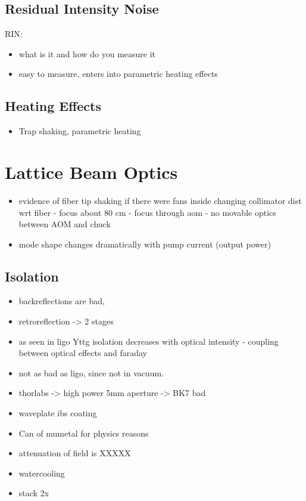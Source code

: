 \documentclass[twocolumn,aps,pra,showpacs,preprintnumbers,bibnotes]{revtex4-1}
\begin{document}
\subsection{Residual Intensity Noise}
RIN:
\begin{itemize}
\item what is it and how do you measure it
\item easy to measure, enters into parametric heating effects
\end{itemize}

\subsection{Heating Effects}
\begin{itemize}
	\item Trap shaking, parametric heating
\end{itemize}

\section{Lattice Beam Optics}


\begin{itemize}
\item evidence of fiber tip shaking if there were fans inside
changing collimator dist wrt fiber - focus about 80 cm - focus through aom - no movable optics between AOM and chuck
\item mode shape changes dramatically with pump current (output power)
\end{itemize}

\subsection{Isolation}
\begin{itemize}
\item backreflections are bad,
\item retroreflection -> 2 stages
\item as seen in ligo Yttg isolation decreases with optical intensity - coupling between optical effects and faraday
\item not as bad as ligo, since not in vacuum.
\item thorlabs -> high power 5mm aperture -> BK7 bad
\item waveplate ibs coating
\item Can of mumetal for physics reasons
\item attenuation of field is XXXXX
\item watercooling
\item stack 2x
\end{itemize}
\end{document}
